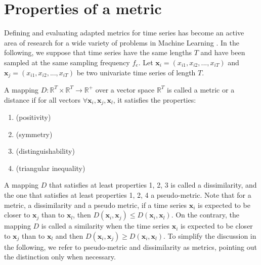 \section{Properties of a metric}

Defining and evaluating adapted metrics for time series has become an active area of research for a wide variety of problems in Machine Learning \cite{Ding2008, Najmeddine2012}. In the following, we suppose that time series have the same lengths $T$ and have been sampled at the same sampling frequency $f_e$. Let $\textbf{x}_i=(x_{i1}, x_{i2}, ..., x_{iT})$ and $\textbf{x}_j=(x_{i1}, x_{i2}, ..., x_{iT})$ be two univariate time series of length $T$. 


A mapping $D:\mathbb{R}^T \times \mathbb{R}^T \rightarrow \mathbb{R}^+$ over a vector space $\mathbb{R}^T$ is called a metric or a distance if for all vectors $\forall \textbf{x}_i, \textbf{x}_j, \textbf{x}_l$, it satisfies the properties:
\begin{enumerate}
	\item { (positivity)}
	\item { (symmetry)}	
	\item { (distinguishability)}
	\item { (triangular inequality)}
\end{enumerate}
A mapping $D$ that satisfies at least properties 1, 2, 3 is called a dissimilarity, and the one that satisfies at least properties 1, 2, 4 a pseudo-metric. Note that for a metric, a dissimilarity and a pseudo metric, if a time series $\textbf{x}_i$ is expected to be closer to $\textbf{x}_j$ than to $\textbf{x}_l$, then $D(\textbf{x}_i,\textbf{x}_j) \leq D(\textbf{x}_i,\textbf{x}_l)$. On the contrary, the mapping $D$ is called a similarity when the time series $\textbf{x}_i$ is expected to be closer to $\textbf{x}_j$ than to $\textbf{x}_l$ and then $D(\textbf{x}_i,\textbf{x}_j) \geq D(\textbf{x}_i,\textbf{x}_l)$. To simplify the discussion in the following, we refer to pseudo-metric and dissimilarity as metrics, pointing out the distinction only when necessary.




